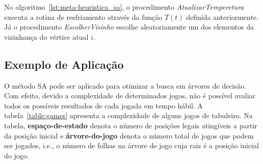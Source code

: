 No algoritmo~\ref{lst:meta-heuristica_sa}, o procedimento \textit{AtualizarTemperetura} executa a
rotina de resfriamento através da função $T(t)$ definida anteriormente. Já o procedimento
\textit{EscolherVisinho} escolhe aleatoriamente um dos elementos da vizinhança do vértice atual $i$.

\subsection{Exemplo de Aplicação}

O método SA pode ser aplicado para otimizar a busca em árvores de decisão.
Com efeito, devido a complexidade de determinados jogos, não é possível
avaliar todos os possíveis resultados de cada jogada em tempo hábil. A
tabela~\ref{table:games} apresenta a complexidade de alguns jogos de tabuleiro.
Na tabela, \textbf{espaço-de-estado} denota o número de posições legais
atingíveis a partir da posição inicial e \textbf{árvore-do-jogo} denota o
número total de jogos que podem ser jogados, i.e., o número de folhas na árvore
de jogo cuja raiz é a posição inicial do jogo.


